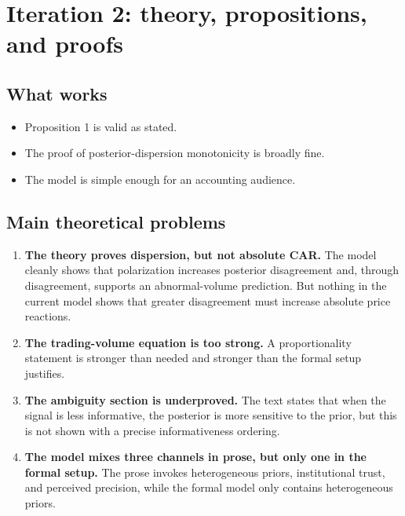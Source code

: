 \documentclass[12pt]{article}
\begin{document}
\section*{Iteration 2: theory, propositions, and proofs}

\subsection*{What works}
\begin{itemize}[leftmargin=1.5em]
    \item Proposition 1 is valid as stated.
    \item The proof of posterior-dispersion monotonicity is broadly fine.
    \item The model is simple enough for an accounting audience.
\end{itemize}

\subsection*{Main theoretical problems}
\begin{enumerate}[label=\textbf{\arabic*.}, leftmargin=1.75em]
    \item \textbf{The theory proves dispersion, but not absolute CAR.} The model cleanly shows that polarization increases posterior disagreement and, through disagreement, supports an abnormal-volume prediction. But nothing in the current model shows that greater disagreement must increase absolute price reactions.
    \item \textbf{The trading-volume equation is too strong.} A proportionality statement is stronger than needed and stronger than the formal setup justifies.
    \item \textbf{The ambiguity section is underproved.} The text states that when the signal is less informative, the posterior is more sensitive to the prior, but this is not shown with a precise informativeness ordering.
    \item \textbf{The model mixes three channels in prose, but only one in the formal setup.} The prose invokes heterogeneous priors, institutional trust, and perceived precision, while the formal model only contains heterogeneous priors.
\end{enumerate}
\end{document}
